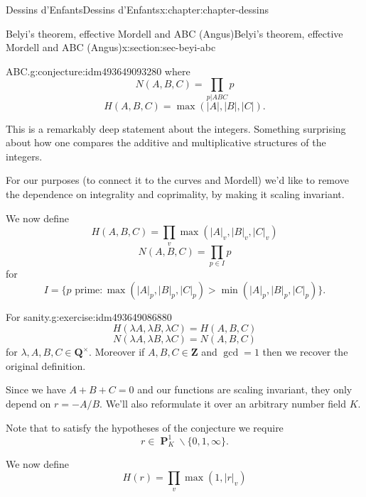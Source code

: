 \documentclass[oneside,10pt,]{book}
\numberwithin{equation}{section}
\newcommand{\units}{^{\times}}
\newcommand{\ZZ}{\mathbf{Z}}
\newcommand{\QQ}{\mathbf{Q}}
\DeclareMathOperator{\PP}{\mathbf{P}}
\newcommand{\gt}{>}
\begin{document}
\begin{chapterptx}{Dessins d'Enfants}{}{Dessins d'Enfants}{}{}{x:chapter:chapter-dessins}
\begin{sectionptx}{Belyi's theorem, effective Mordell and ABC (Angus)}{}{Belyi's theorem, effective Mordell and ABC (Angus)}{}{}{x:section:sec-beyi-abc}
\begin{conjecture}{ABC.}{}{g:conjecture:idm493649093280}
where%
\begin{equation*}
N(A,B,C) =  \prod_{p|ABC} p
\end{equation*}
%
\begin{equation*}
H(A,B,C) = \max(|A|,|B|,|C|)\text{.}
\end{equation*}
%
\end{conjecture}
This is a remarkably deep statement about the integers. Something surprising about how one compares the additive and multiplicative structures of the integers.%
\par
For our purposes (to connect it to the curves and Mordell) we'd like to remove the dependence on integrality and coprimality, by making it scaling invariant.%
\par
We now define%
\begin{equation*}
H(A,B,C) = \prod_{v}\max(|A|_v,|B|_v,|C|_v)
\end{equation*}
%
\begin{equation*}
N(A,B,C) =  \prod_{p\in I} p
\end{equation*}
for%
\begin{equation*}
I = \{p \text{ prime} : \max(|A|_p,|B|_p,|C|_p) \gt \min(|A|_p,|B|_p,|C|_p)\}\text{.}
\end{equation*}
%
\begin{inlineexercise}{For sanity.}{g:exercise:idm493649086880}%
%
\begin{equation*}
H(\lambda A,\lambda B,\lambda C)  = H(A,B,C)
\end{equation*}
%
\begin{equation*}
N(\lambda A,\lambda B,\lambda C)  = N(A,B,C)
\end{equation*}
for \(\lambda, A,B,C \in \QQ\units\). Moreover if \(A,B,C \in \ZZ\) and \(\gcd = 1\) then we recover the original definition.%
\end{inlineexercise}
Since we have \(A+ B+C = 0\) and our functions are scaling invariant, they only depend on \(r=  - A/B\). We'll also reformulate it over an arbitrary number field \(K\).%
\par
Note that to satisfy the hypotheses of the conjecture we require%
\begin{equation*}
r \in \PP^1_K \smallsetminus \{0,1,\infty\}\text{.}
\end{equation*}
%
\par
We now define%
\begin{equation*}
H(r) = \prod_{v}\max(1,|r|_v)
\end{equation*}
%
\begin{equation*}

\end{equation*}
\end{sectionptx}
\end{chapterptx}
\end{document}

